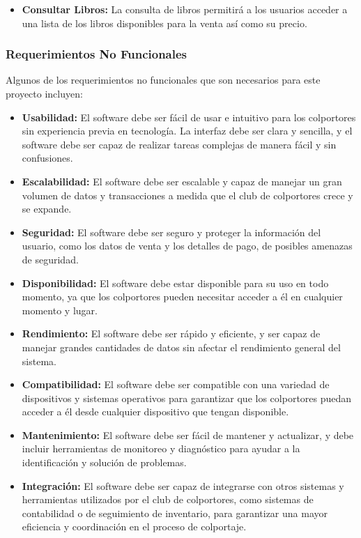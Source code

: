 \documentclass[runningheads]{llncs}
\begin{document}
\begin{itemize}
\begin{itemize}
        \item \textbf{Consultar Libros: }La consulta de libros permitirá a los usuarios acceder a una lista de los libros disponibles para la venta así como su precio. 
    \end{itemize}    
\end{itemize}
\subsubsection{Requerimientos No Funcionales}
Algunos de los requerimientos no funcionales que son necesarios para este proyecto incluyen:
\begin{itemize}
    \item \textbf{Usabilidad: } El software debe ser fácil de usar e intuitivo para los colportores sin experiencia previa en tecnología. La interfaz debe ser clara y sencilla, y el software debe ser capaz de realizar tareas complejas de manera fácil y sin confusiones.
    \item \textbf{Escalabilidad: } El software debe ser escalable y capaz de manejar un gran volumen de datos y transacciones a medida que el club de colportores crece y se expande.
    \item \textbf{Seguridad: } El software debe ser seguro y proteger la información del usuario, como los datos de venta y los detalles de pago, de posibles amenazas de seguridad.
    \item \textbf{Disponibilidad: } El software debe estar disponible para su uso en todo momento, ya que los colportores pueden necesitar acceder a él en cualquier momento y lugar.
    \item \textbf{Rendimiento: }El software debe ser rápido y eficiente, y ser capaz de manejar grandes cantidades de datos sin afectar el rendimiento general del sistema.
    \item \textbf{Compatibilidad: } El software debe ser compatible con una variedad de dispositivos y sistemas operativos para garantizar que los colportores puedan acceder a él desde cualquier dispositivo que tengan disponible.
    \item \textbf{Mantenimiento: } El software debe ser fácil de mantener y actualizar, y debe incluir herramientas de monitoreo y diagnóstico para ayudar a la identificación y solución de problemas.
    \item \textbf{Integración: } El software debe ser capaz de integrarse con otros sistemas y herramientas utilizados por el club de colportores, como sistemas de contabilidad o de seguimiento de inventario, para garantizar una mayor eficiencia y coordinación en el proceso de colportaje.
\end{itemize}
\end{document}
